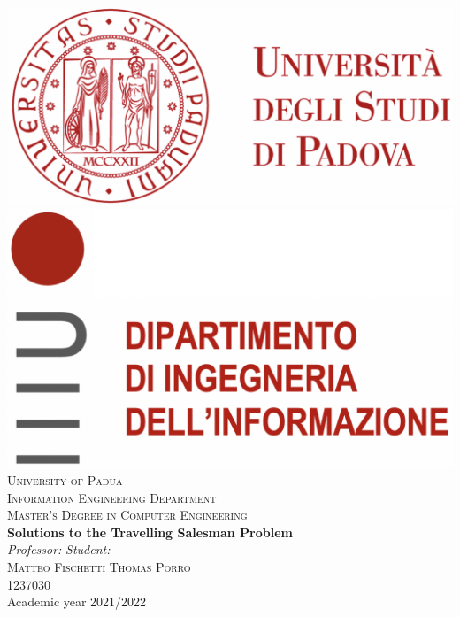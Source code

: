 



\begin{titlepage}
\begin{center}

\includegraphics[scale=0.2]{images/logo_unipd.png} \hfill \includegraphics[scale=0.2]{images/logo_dei.png}\\
\vspace{0.8cm}
\textsc{\LARGE University of Padua}\\
\vspace{0.45cm}
\textsc{\large Information Engineering Department}\\
\vspace{0.4cm}
\textsc{\large Master’s Degree in Computer Engineering}\\
\vfill
{ \LARGE \bfseries Solutions to the Travelling Salesman Problem
}\\
\vfill
\textit{\large Professor:} \hfill \textit{\large Student:}\\
\textsc{\large Matteo Fischetti} \hfill \textsc{Thomas Porro}\\
\hfill \textsc{1237030}\\

\vfill
{\large Academic year 2021/2022}
\end{center}
\end{titlepage}

